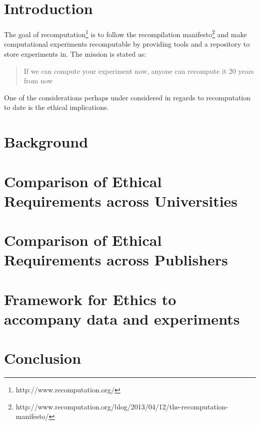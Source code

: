 \documentclass[12pt]{article}
\begin{document}
\maketitle

\section{Introduction}
The goal of recomputation\footnote{http://www.recomputation.org/} is to follow the recompilation manifesto\footnote{http://www.recomputation.org/blog/2013/04/12/the-recomputation-manifesto/} and make computational experiments recomputable by providing tools and a repository to store experiments in. The mission is stated as:
\begin{quote}
If we can compute your experiment now, anyone can recompute it 20 years from now
\end{quote}

One of the considerations perhaps under considered in regards to recomputation to date is the ethical implications. 
\section{Background}

\section{Comparison of Ethical Requirements across Universities}

\section{Comparison of Ethical Requirements across Publishers}

\section{Framework for Ethics to accompany data and experiments}

\section{Conclusion}
\end{document}
